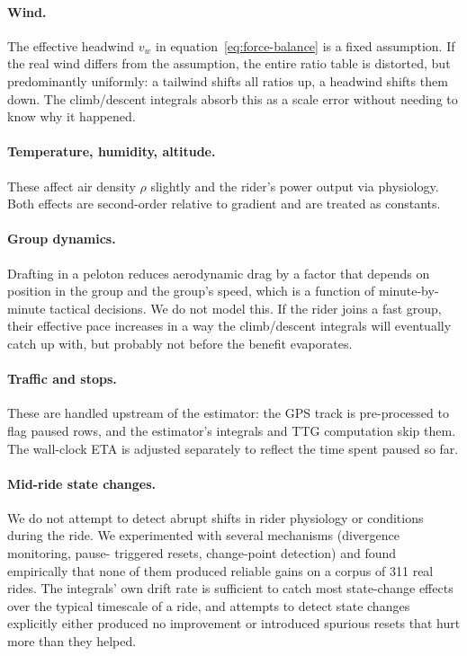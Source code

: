\documentclass[11pt,a4paper]{article}
\begin{document}
\paragraph{Wind.} The effective headwind $v_w$ in
equation~\eqref{eq:force-balance} is a fixed assumption. If the real
wind differs from the assumption, the entire ratio table is
distorted, but predominantly uniformly: a tailwind shifts all ratios
up, a headwind shifts them down. The climb/descent integrals absorb
this as a scale error without needing to know why it happened.

\paragraph{Temperature, humidity, altitude.} These affect air density
$\rho$ slightly and the rider's power output via physiology. Both
effects are second-order relative to gradient and are treated as
constants.

\paragraph{Group dynamics.} Drafting in a peloton reduces aerodynamic
drag by a factor that depends on position in the group and the
group's speed, which is a function of minute-by-minute tactical
decisions. We do not model this. If the rider joins a fast group,
their effective pace increases in a way the climb/descent integrals
will eventually catch up with, but probably not before the benefit
evaporates.

\paragraph{Traffic and stops.} These are handled upstream of the
estimator: the GPS track is pre-processed to flag paused rows, and the
estimator's integrals and TTG computation skip them. The wall-clock
ETA is adjusted separately to reflect the time spent paused so far.

\paragraph{Mid-ride state changes.} We do not attempt to detect
abrupt shifts in rider physiology or conditions during the ride. We
experimented with several mechanisms (divergence monitoring, pause-
triggered resets, change-point detection) and found empirically that
none of them produced reliable gains on a corpus of 311 real rides.
The integrals' own drift rate is sufficient to catch most
state-change effects over the typical timescale of a ride, and
attempts to detect state changes explicitly either produced no
improvement or introduced spurious resets that hurt more than they
helped.
\end{document}
